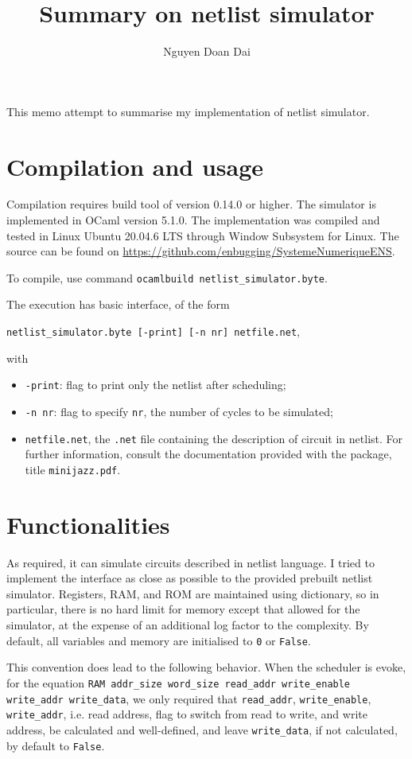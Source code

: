 \documentclass{amsart}
\title{Summary on netlist simulator}
\author{Nguyen Doan Dai}
\begin{document}
	\maketitle
	
	This memo attempt to summarise my implementation of netlist simulator.
	
	\section{Compilation and usage}
	Compilation requires build tool  of version 0.14.0 or higher. The simulator is implemented in OCaml version 5.1.0. The implementation was compiled and tested in Linux Ubuntu 20.04.6 LTS through Window Subsystem for Linux. The source can be found on \url{https://github.com/enbugging/SystemeNumeriqueENS}.
	
	To compile, use command \texttt{ocamlbuild netlist\_simulator.byte}.
	
	The execution has basic interface, of the form 
	
	\texttt{netlist\_simulator.byte [-print] [-n nr] netfile.net}, 
	
	with
	\begin{itemize}
		\item \texttt{-print}: flag to print only the netlist after scheduling;
		\item \texttt{-n nr}: flag to specify \texttt{nr}, the number of cycles to be simulated;
		\item \texttt{netfile.net}, the \texttt{.net} file containing the description of circuit in netlist. For further information, consult the documentation provided with the package, title \texttt{minijazz.pdf}.
	\end{itemize}
	
	\section{Functionalities}
	As required, it can simulate circuits described in netlist language. I tried to implement the interface as close as possible to the provided prebuilt netlist simulator. Registers, RAM, and ROM are maintained using dictionary, so in particular, there is no hard limit for memory except that allowed for the simulator, at the expense of an additional log factor to the complexity. By default, all variables and memory are initialised to \texttt{0} or \texttt{False}. 
	
	This convention does lead to the following behavior. When the scheduler is evoke, for the equation \texttt{RAM addr\_size word\_size read\_addr write\_enable write\_addr write\_data}, we only required that \texttt{read\_addr}, \texttt{write\_enable}, \texttt{write\_addr}, i.e. read address, flag to switch from read to write, and write address, be calculated and well-defined, and leave \texttt{write\_data}, if not calculated, by default to \texttt{False}.
	
\end{document}
